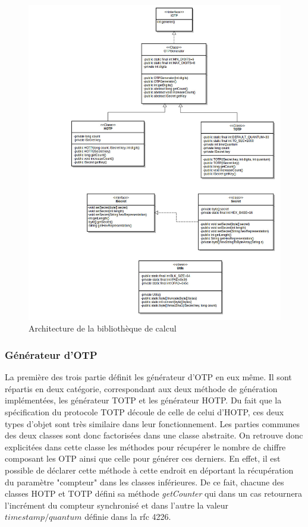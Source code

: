 \begin{figure}
  \centering
  \includegraphics[scale=0.4]{../graphics/uml_lib.jpg}
  \caption{Architecture de la bibliothèque de calcul}
  \label{fig:umlLib}
\end{figure}

\subsubsection{Générateur d'OTP}
La première des trois partie définit les générateur d'OTP en eux même. Il sont répartis en
deux catégorie, correspondant aux deux méthode de génération implémentées, les générateur
TOTP et les générateur HOTP. Du fait que la spécification du protocole TOTP découle de celle
de celui d'HOTP, ces deux types d'objet sont très similaire dans leur fonctionnement. Les 
parties communes des deux classes sont donc factorisées dans une classe abstraite. On
retrouve donc explicitées dans cette classe les méthodes pour récupérer le nombre de chiffre
composant les OTP ainsi que celle pour générer ces derniers. En effet, il est possible de 
déclarer cette méthode à cette endroit en déportant la récupération du paramètre "compteur"
dans les classes inférieures. De ce fait, chacune des classes HOTP et TOTP défini sa
méthode \emph{getCounter} qui dans un cas retournera l'incrément du compteur synchronisé et 
dans l'autre la valeur $ timestamp / quantum $ définie dans la rfc 4226\cite{TOTP}. 

